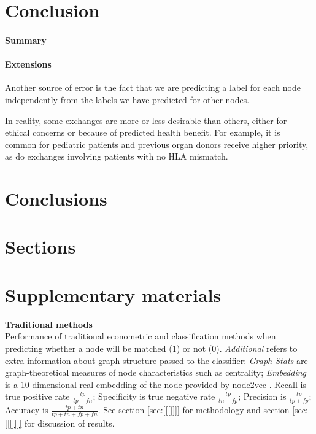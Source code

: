 \documentclass[format=acmsmall, review=false]{acmart}
\begin{document}
\section{Conclusion}

\paragraph{Summary}

\paragraph{Extensions}
Another source of error is the fact that we are predicting a label for each node independently from the labels we have predicted for other nodes.


 In reality, some exchanges are more or less desirable than others, either for ethical concerns or because of predicted health benefit. For example, it is common for pediatric patients and previous organ donors receive higher priority, as do exchanges involving patients with no HLA mismatch. 





\section{Conclusions}



\appendix
\section{Sections}

\section{Supplementary materials}


\begin{table}
  \centering
  \singlespacing
  \hspace*{-1cm}
  
   \caption{\textbf{Traditional methods} \\ Performance of traditional econometric and classification methods when predicting whether a node will be matched (1) or not (0). \emph{Additional} refers to extra information about graph structure passed to the classifier: \emph{Graph Stats} are graph-theoretical measures of node characteristics such as centrality; \emph{Embedding} is a 10-dimensional real embedding of the node provided by node2vec \citep{grover2016node2vec}. Recall is true positive rate $\frac{tp}{tp+fn}$; Specificity is true negative rate $\frac{tp}{tn+fp}$; Precision is $\frac{tp}{tp+fp}$; Accuracy is $\frac{tp+tn}{tp+tn+fp+fn}$. See section \ref{sec:[[[]]]} for methodology and section \ref{sec:[[[]]]} for discussion of results. }
  \label{tab:tradional_ml_classifier}
\end{table}
\end{document}
